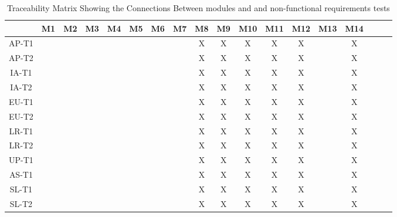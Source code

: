 \documentclass[12pt, titlepage]{article}
\begin{document}
\begin{landscape}
\begin{table}[h!]
\centering
\begin{tabular}{|c|c|c|c|c|c|c|c|c|c|c|c|c|c|c|c|c|c|}
\hline
	& M1 & M2 & M3 & M4 & M5 & M6 & M7 & M8 & M9 & M10 & M11 & M12 & M13& M14\\
\hline
AP-T1        & & & & & & & & X& X& X& X& X& &X \\ \hline
AP-T2        & & & & & & & & X& X& X& X& X& &X \\ \hline
IA-T1        & & & & & & & & X& X& X& X& X& &X \\ \hline
IA-T2        & & & & & & & & X& X& X& X& X& &X \\ \hline
EU-T1        & & & & & & & & X& X& X& X& X& &X \\ \hline
EU-T2        & & & & & & & & X& X& X& X& X& &X \\ \hline
LR-T1        & & & & & & & & X& X& X& X& X& &X \\ \hline
LR-T2        & & & & & & & & X& X& X& X& X& &X \\ \hline
UP-T1        & & & & & & & & X& X& X& X& X& &X \\ \hline
AS-T1        & & & & & & & & X& X& X& X& X& &X \\ \hline
SL-T1        & & & & & & & & X& X& X& X& X& &X \\ \hline
SL-T2        & & & & & & & & X& X& X& X& X& &X \\ \hline
\end{tabular}
\caption{Traceability Matrix Showing the Connections Between modules and  and non-functional requirements tests}
\label{Table:A_trace}
\end{table}
\end{landscape}
\end{document}
